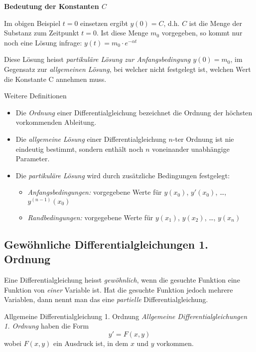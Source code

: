 \textbf{Bedeutung der Konstanten $C$}

Im obigen Beispiel $t = 0$ einsetzen ergibt $y(0) = C$, d.h. $C$ ist die Menge der Substanz zum Zeitpunkt $t = 0$.
Ist diese Menge $m_0$ vorgegeben, so kommt nur noch eine Lösung infrage: $y(t) = m_0 \cdot e^{-\alpha t}$

Diese Lösung heisst \emph{partikuläre Lösung zur Anfangsbedingung $y(0) = m_0$}, im Gegensatz zur \emph{allgemeinen Lösung}, bei welcher nicht festgelegt ist, welchen Wert die Konstante C annehmen muss.

\begin{definition}{Weitere Definitionen}
    \begin{itemize}
        \item Die \emph{Ordnung} einer Differentialgleichung bezeichnet die Ordnung der höchsten vorkommenden Ableitung.
        \item Die \emph{allgemeine Lösung} einer Differentialgleichung $n$-ter Ordnung ist nie eindeutig bestimmt, sondern enthält noch $n$ voneinander unabhängige Parameter.
        \item Die \emph{partikuläre Lösung} wird durch zusätzliche Bedingungen festgelegt:
        \begin{itemize}
            \item \emph{Anfangsbedingungen:} vorgegebene Werte für $y(x_0)$, $y'(x_0)$, \dots, $y^{(n-1)}(x_0)$
            \item \emph{Randbedingungen:} vorgegebene Werte für $y(x_1)$, $y(x_2)$, \dots, $y(x_n)$
        \end{itemize}
    \end{itemize}
\end{definition}

\newpage

\subsection{Gewöhnliche Differentialgleichungen 1. Ordnung}\label{subsec:gewoehnliche-differentialgleichungen-1.-ordnung}

Eine Differentialgleichung heisst \emph{gewöhnlich}, wenn die gesuchte Funktion eine Funktion von \emph{einer} Variable ist.
Hat die gesuchte Funktion jedoch mehrere Variablen, dann nennt man das eine \emph{partielle} Differentialgleichung.

\begin{definition}{Allgemeine Differentialgleichung 1. Ordnung}
    \emph{Allgemeine Differentialgleichungen 1. Ordnung} haben die Form \[y' = F(x,y)\] wobei $F(x,y)$ ein Ausdruck ist, in dem $x$ und $y$ vorkommen.
\end{definition}

